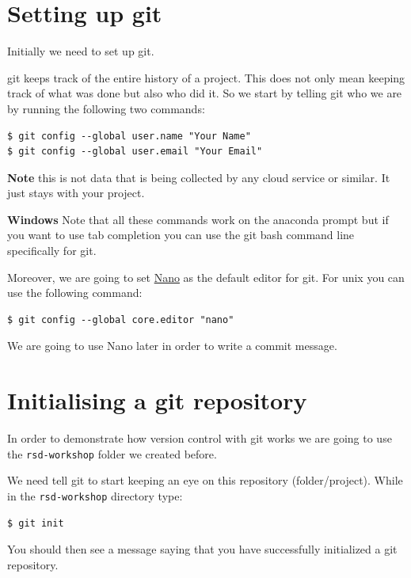 \documentclass[11pt]{article}
\begin{document}
    \hypertarget{setting-up-git}{%
\section{Setting up git}\label{setting-up-git}}

Initially we need to set up git.

git keeps track of the entire history of a project. This does not only
mean keeping track of what was done but also who did it. So we start by
telling git who we are by running the following two commands:

\begin{verbatim}
$ git config --global user.name "Your Name"
$ git config --global user.email "Your Email"
\end{verbatim}

\textbf{Note} this is not data that is being collected by any cloud
service or similar. It just stays with your project.

\textbf{Windows} Note that all these commands work on the anaconda
prompt but if you want to use tab completion you can use the git bash
command line specifically for git.

Moreover, we are going to set \href{https://www.nano-editor.org}{Nano}
as the default editor for git. For unix you can use the following
command:

\begin{verbatim}
$ git config --global core.editor "nano"
\end{verbatim}

We are going to use Nano later in order to write a commit message.

    \hypertarget{initialising-a-git-repository}{%
\section{Initialising a git
repository}\label{initialising-a-git-repository}}

In order to demonstrate how version control with git works we are going
to use the \texttt{rsd-workshop} folder we created before.

We need tell git to start keeping an eye on this repository
(folder/project). While in the \texttt{rsd-workshop} directory type:

\begin{verbatim}
$ git init
\end{verbatim}

You should then see a message saying that you have successfully
initialized a git repository.
\end{document}
